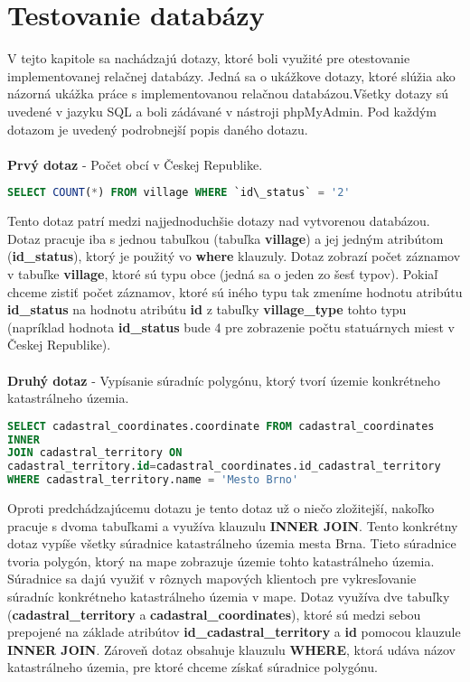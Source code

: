 \chapter{Testovanie databázy}
\label{chapter4}
V tejto kapitole sa nachádzajú dotazy, ktoré boli využité pre otestovanie implementovanej relačnej databázy. Jedná sa o ukážkove dotazy, ktoré slúžia ako názorná ukážka práce s implementovanou relačnou databázou.Všetky dotazy sú uvedené v jazyku SQL a boli zádávané v nástroji phpMyAdmin. Pod každým dotazom je uvedený podrobnejší popis daného dotazu.
\\ \\
{\bf Prvý dotaz} - Počet obcí v Českej Republike.
\begin{lstlisting}[language=SQL]
SELECT COUNT(*) FROM village WHERE `id\_status` = '2'
\end{lstlisting}
Tento dotaz patrí medzi najjednoduchšie dotazy nad vytvorenou databázou. Dotaz pracuje iba s jednou tabuľkou (tabuľka {\bf village}) a jej jedným atribútom ({\bf id\_status}), ktorý je použitý vo {\bf where} klauzuly. Dotaz zobrazí počet záznamov v tabuľke {\bf village}, ktoré sú typu obce (jedná sa o jeden zo šesť typov). Pokiaľ chceme zistiť počet záznamov, ktoré sú iného typu tak zmeníme hodnotu atribútu {\bf id\_status} na hodnotu atribútu {\bf id} z tabuľky {\bf village\_type} tohto typu (napríklad hodnota {\bf id\_status} bude 4 pre zobrazenie počtu statuárnych miest v Českej Republike). \\ \\
{\bf Druhý dotaz} - Vypísanie súradníc polygónu, ktorý tvorí územie konkrétneho katastrálneho územia.
\begin{lstlisting}[language=SQL]
SELECT cadastral_coordinates.coordinate FROM cadastral_coordinates 
INNER 
JOIN cadastral_territory ON
cadastral_territory.id=cadastral_coordinates.id_cadastral_territory
WHERE cadastral_territory.name = 'Mesto Brno'
\end{lstlisting}
Oproti predchádzajúcemu dotazu je tento dotaz už o niečo zložitejší, nakoľko pracuje s dvoma tabuľkami a využíva klauzulu {\bf INNER JOIN}.
Tento konkrétny dotaz vypíše všetky súradnice katastrálneho územia mesta Brna. Tieto súradnice tvoria polygón, ktorý na mape zobrazuje územie tohto katastrálneho územia. Súradnice sa dajú využiť v rôznych mapových klientoch pre vykresľovanie súradníc konkrétneho katastrálneho územia v mape. Dotaz využíva dve tabuľky ({\bf cadastral\_territory} a {\bf cadastral\_coordinates}), ktoré sú medzi sebou prepojené na základe atribútov {\bf id\_cadastral\_territory} a {\bf id} pomocou klauzule {\bf INNER JOIN}. Zároveň dotaz obsahuje klauzulu {\bf WHERE}, ktorá udáva názov katastrálneho územia, pre ktoré chceme získať súradnice polygónu. \\ \\ \\ \\ \\ \\

